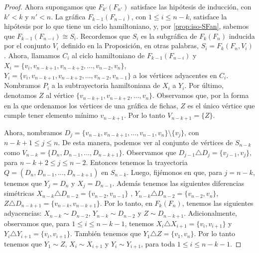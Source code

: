 \begin{proof}
            Ahora supongamos que $F_{k'}(F_{n'})$ satisface las hip\'otesis de
            inducci\'on, con $k'< k$ y $n'<n$. La gr\'afica $F_{k-1}(F_{n-i})$,
            con $1 \leq i \leq n-k$, satisface la hip\'otesis por lo que tiene
            un ciclo hamiltoniano, y, por \cref{prop:iso-SFan}, sabemos que
            $F_{k-1}(F_{n-i}) \cong S_i$. Recordemos que  $S_i$ es la
            subgr\'afica de $F_k(F_n)$ inducida por el conjunto $V_i$ definido
            en la Proposici\'on, en otras palabras, $S_i= F_k(F_n, V_i)$. Ahora,
            llamamos $C_i$ al ciclo hamiltoniano de $F_{k-1}(F_{n-i})$ y $X_i =
            \{v_i, v_{n-k+1}, v_{n-k+2}, \dots, v_{n-2}, v_n\}$, $Y_i= \{v_i,
            v_{n-k+1}, v_{n-k+2}, \dots, v_{n-2}, v_{n-1}\}$ a los v\'ertices
            adyacentes en $C_i$. Nombramos $P_i$ a la subtrayectoria
            hamiltoniana de $X_i$ a $Y_i$. Por \'ultimo, denotamos $Z$ al
            v\'ertice $\{v_{n-k+1}, v_{n-k+2}, \dots, v_n\}$. Observamos que,
            por la forma en la que ordenamos los v\'ertices de una gr\'afica de
            fichas, $Z$ es el \'unico v\'ertice que cumple tener elemento m\'inimo
            $v_{n-k+1}$. Por lo tanto  $V_{n-k+1} = \{Z\}$. 
    
            Ahora, nombramos $D_j =\{v_{n-k}, v_{n-k+1}, \dots, v_{n-1}, v_n\}
            \setminus \{v_j\}$, con $n-k+1 \leq j \leq n$.  De esta manera,
            podemos ver al conjunto de v\'ertices de $S_{n-k}$ como
            $V_{n-k}=\{D_n, D_{n-1}, \dots, D_{n-k+1}\}$. Observamos que
            $D_{j-1} \triangle D_j= \{v_{j-1}, v_j\}$, para $n-k+2 \leq j \leq
            n-2$. Entonces tenemos la trayectoria $Q= (D_n, D_{n-1}, \dots,
            D_{n-k+1})$ en $S_{n-k}$.     
            Luego, fij\'emonos en que, para $j= n-k$, tenemos que $Y_j = D_n$ y
            $X_j= D_{n-1}$. Adem\'as tenemos las siguientes diferencias
            sim\'etricas $X_{n-k}\triangle D_{n-2} =\{v_{n-2}, v_{n-1}\}$ ,
            $Y_{n-k}\triangle D_{n-2} =\{v_{n-2}, v_n\}$, $Z\triangle D_{n-k+1}
            =\{v_{n-k}, v_{n-k+1}\}$. Por lo tanto, en $F_k(F_n)$, tenemos las
            siguientes adyacencias: $X_{n-k} \sim D_{n-2}$, $Y_{n-k} \sim
            D_{n-2}$ y $Z \sim D_{n-k+1}$. Adicionalmente, observamos que, para
            $1 \leq i \leq n- k- 1$, tenemos $X_{i} \triangle X_{i+1}= \{v_i,
            v_{i+1}\}$ y $Y_i \triangle Y_{i+1} = \{v_i, v_{i+1}\}$. Tambi\'en
            tenemos que $Y_1 \triangle Z = \{v_1, v_n\}$. Por lo tanto tenemos
            que $Y_1 \sim Z$, $X_i \sim X_{i+1}$ y $Y_i \sim Y_{i+1}$, para toda
            $1 \leq i \leq n-k-1$.
            

\end{proof}
